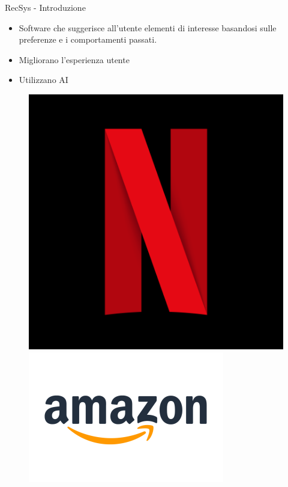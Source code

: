\begin{frame}{RecSys - Introduzione}
\begin{itemize}
\item Software che suggerisce all'utente elementi di interesse basandosi sulle preferenze e i comportamenti passati.
    \item Migliorano l'esperienza utente
    \item Utilizzano AI
\end{itemize}
\begin{figure}[h!]
    \centering
    \begin{minipage}{0.15\textwidth}
        \centering
        \includegraphics[width=\textwidth]{images/netflix.png}
    \end{minipage}\hfill
    \begin{minipage}{0.15\textwidth}
        \centering
        \includegraphics[width=\textwidth]{images/amazon.png}

\end{minipage}
\end{figure}
\end{frame}
